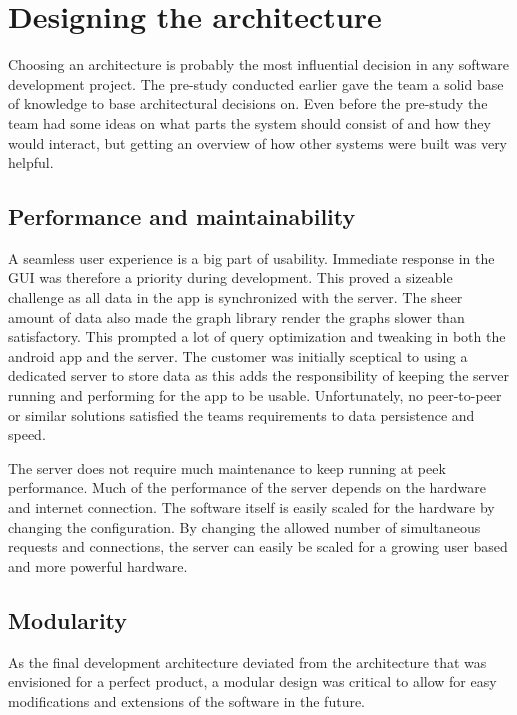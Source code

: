\section{Designing the architecture}
Choosing an architecture is probably the most influential decision in any software development project. The pre-study conducted earlier gave the team a solid base of knowledge to base architectural  decisions on. Even before the pre-study the team had some ideas on what parts the system should consist of and how they would interact, but getting an overview of how other systems were built was very helpful. 

\subsection{Performance and maintainability}
A seamless user experience is a big part of usability. Immediate response in the GUI was therefore a priority during development. This proved a sizeable challenge as all data in the app is synchronized with the server. The sheer amount of data also made the graph library render the graphs slower than satisfactory. This prompted a lot of query optimization and tweaking in both the android app and the server. The customer was initially sceptical to using a dedicated server to store data as this adds the responsibility of keeping the server running and performing for the app to be usable. Unfortunately, no peer-to-peer or similar solutions satisfied the teams requirements to data persistence and speed.

The server does not require much maintenance to keep running at peek performance. Much of the performance of the server depends on the hardware and internet connection. The software itself is easily scaled for the hardware by changing the configuration. By changing the allowed number of simultaneous requests and connections, the server can easily be scaled for a growing user based and more powerful hardware.

\subsection{Modularity}
As the final development architecture deviated from the architecture that was envisioned for a perfect product, a modular design was critical to allow for easy modifications and extensions of the software in the future. 